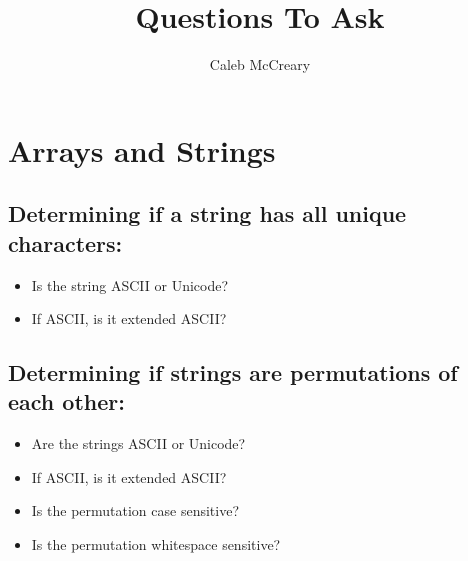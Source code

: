 \documentclass{article}
\author{Caleb McCreary}
\date{}
\title{Questions To Ask}
\begin{document}
\maketitle
\section*{Arrays and Strings}
\subsection*{Determining if a string has all unique characters:}
\begin{itemize}
    \item Is the string ASCII or Unicode?
    \item If ASCII, is it extended ASCII?
\end{itemize}

\subsection*{Determining if strings are permutations of each other:}
\begin{itemize}
    \item Are the strings ASCII or Unicode?
    \item If ASCII, is it extended ASCII?
    \item Is the permutation case sensitive?
    \item Is the permutation whitespace sensitive?
\end{itemize}
\end{document}
